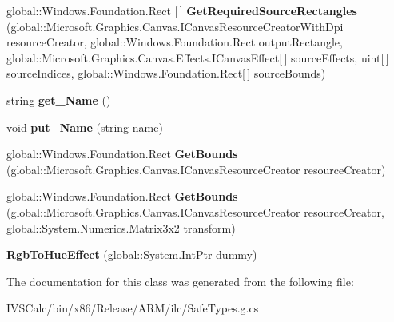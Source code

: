 \begin{DoxyCompactItemize}
\item 
\mbox{\label{class_microsoft_1_1_graphics_1_1_canvas_1_1_effects_1_1_rgb_to_hue_effect_a9a5bddeed604775eae7503a0f861add0}} 
global\+::\+Windows.\+Foundation.\+Rect \mbox{[}$\,$\mbox{]} {\bfseries Get\+Required\+Source\+Rectangles} (global\+::\+Microsoft.\+Graphics.\+Canvas.\+I\+Canvas\+Resource\+Creator\+With\+Dpi resource\+Creator, global\+::\+Windows.\+Foundation.\+Rect output\+Rectangle, global\+::\+Microsoft.\+Graphics.\+Canvas.\+Effects.\+I\+Canvas\+Effect\mbox{[}$\,$\mbox{]} source\+Effects, uint\mbox{[}$\,$\mbox{]} source\+Indices, global\+::\+Windows.\+Foundation.\+Rect\mbox{[}$\,$\mbox{]} source\+Bounds)
\item 
\mbox{\label{class_microsoft_1_1_graphics_1_1_canvas_1_1_effects_1_1_rgb_to_hue_effect_a1018b4148d8c34eef12be48a7dcb9291}} 
string {\bfseries get\+\_\+\+Name} ()
\item 
\mbox{\label{class_microsoft_1_1_graphics_1_1_canvas_1_1_effects_1_1_rgb_to_hue_effect_a77766b0155f15464c79e76cb25d94cd3}} 
void {\bfseries put\+\_\+\+Name} (string name)
\item 
\mbox{\label{class_microsoft_1_1_graphics_1_1_canvas_1_1_effects_1_1_rgb_to_hue_effect_aa01c85f7d284fdd4dfab695a9b244201}} 
global\+::\+Windows.\+Foundation.\+Rect {\bfseries Get\+Bounds} (global\+::\+Microsoft.\+Graphics.\+Canvas.\+I\+Canvas\+Resource\+Creator resource\+Creator)
\item 
\mbox{\label{class_microsoft_1_1_graphics_1_1_canvas_1_1_effects_1_1_rgb_to_hue_effect_a0e32374718507e1f848f4a50b8b35fd8}} 
global\+::\+Windows.\+Foundation.\+Rect {\bfseries Get\+Bounds} (global\+::\+Microsoft.\+Graphics.\+Canvas.\+I\+Canvas\+Resource\+Creator resource\+Creator, global\+::\+System.\+Numerics.\+Matrix3x2 transform)
\item 
\mbox{\label{class_microsoft_1_1_graphics_1_1_canvas_1_1_effects_1_1_rgb_to_hue_effect_aa1f48d64f4e383b977ca17ef5fa1495a}} 
{\bfseries Rgb\+To\+Hue\+Effect} (global\+::\+System.\+Int\+Ptr dummy)
\end{DoxyCompactItemize}


The documentation for this class was generated from the following file\+:\begin{DoxyCompactItemize}
\item 
I\+V\+S\+Calc/bin/x86/\+Release/\+A\+R\+M/ilc/Safe\+Types.\+g.\+cs\end{DoxyCompactItemize}
